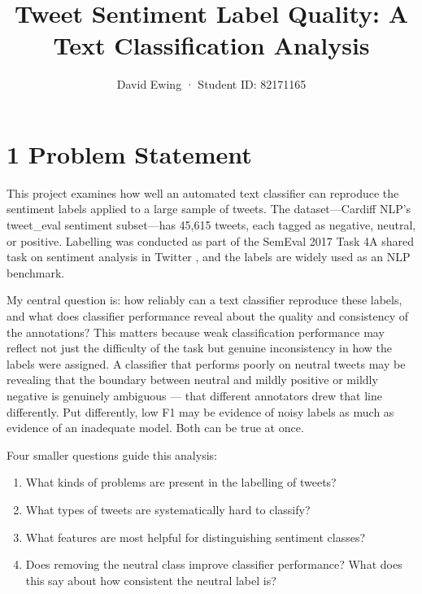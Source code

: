 \documentclass[12pt]{article}
\title{Tweet Sentiment Label Quality: A Text Classification Analysis}
\author{David Ewing · Student ID: 82171165}
\date{}
\begin{document}
\maketitle



\section*{1 Problem Statement}



This project examines how well an automated text classifier can reproduce the sentiment labels applied to a large sample of tweets. The dataset---Cardiff NLP's tweet\_eval sentiment subset---has 45,615 tweets, each tagged as negative, neutral, or positive. Labelling was conducted as part of the SemEval 2017 Task 4A shared task on sentiment analysis in Twitter \citep{rosenthal2017semeval}, and the labels are widely used as an NLP benchmark.

My central question is: how reliably can a text classifier reproduce these labels, and what does classifier performance reveal about the quality and consistency of the annotations? This matters because weak classification performance may reflect not just the difficulty of the task but genuine inconsistency in how the labels were assigned. A classifier that performs poorly on neutral tweets may be revealing that the boundary between neutral and mildly positive or mildly negative is genuinely ambiguous --- that different annotators drew that line differently. Put differently, low F1 may be evidence of noisy labels as much as evidence of an inadequate model. Both can be true at once.

Four smaller questions guide this analysis:

\begin{enumerate}

  \item What kinds of problems are present in the labelling of tweets?

  \item What types of tweets are systematically hard to classify?

  \item What features are most helpful for distinguishing sentiment classes?

  \item Does removing the neutral class improve classifier performance? What does this say about how consistent the neutral label is?

\end{enumerate}
\end{document}

